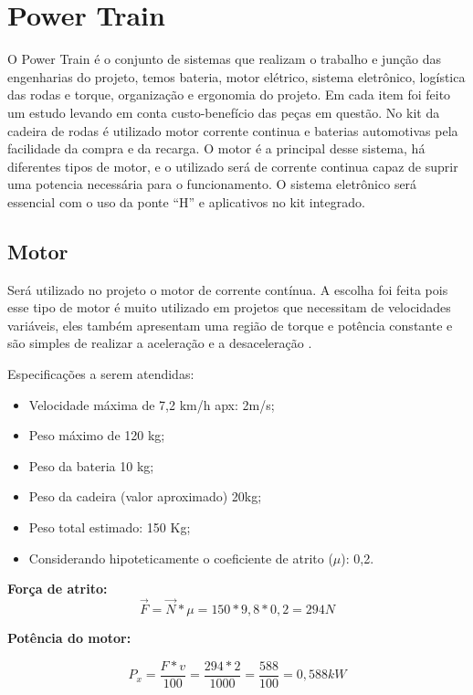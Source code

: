 \section{Power Train}
O Power Train é o conjunto de sistemas que realizam o trabalho e junção das engenharias do projeto, temos bateria, motor elétrico, sistema eletrônico, logística das rodas e torque, organização e ergonomia do projeto. Em cada item foi feito um estudo levando em conta custo-benefício das peças em questão. No kit da cadeira de rodas é utilizado motor corrente continua e baterias automotivas pela facilidade da compra e da recarga. O motor é a principal desse sistema, há diferentes tipos de motor, e o utilizado será de corrente continua capaz de suprir uma potencia necessária para o funcionamento. O sistema eletrônico será essencial com o uso da ponte “H” e aplicativos no kit integrado.

\subsection{Motor}

Será utilizado no projeto o motor de corrente contínua. A escolha foi feita pois esse tipo de motor é muito utilizado em projetos que necessitam de velocidades variáveis, eles também apresentam uma região de torque e potência constante e são simples de realizar a aceleração e a desaceleração \cite{manual_bateria_unipower}.

Especificações a serem atendidas:
\begin{itemize}
 \item Velocidade máxima de 7,2 km/h apx: 2m/s;
 \item Peso máximo de 120 kg;
 \item Peso da bateria 10 kg;
 \item Peso da cadeira (valor aproximado) 20kg;
 \item Peso total estimado: 150 Kg;
 \item Considerando hipoteticamente o coeficiente de atrito ($\mu$): 0,2.
\end{itemize}

\textbf{Força de atrito:}
\begin{equation}
 \overrightarrow{F} = \overrightarrow{N} * \mu = 150 * 9,8 * 0,2 = 294N
\end{equation}

\textbf{Potência do motor:}

\begin{equation}
 P_{x} = \frac{F * v}{100} = \frac{294 * 2}{1000} = \frac{588}{100} = 0,588kW
\end{equation}

